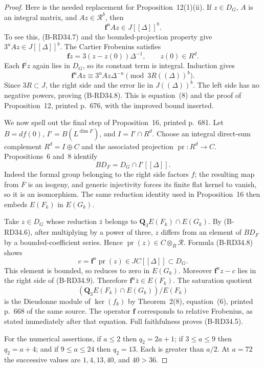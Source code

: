 \begin{proof}
Here is the needed replacement for Proposition~12(1)(ii). If
$z\in D_G$, $A$ is an integral matrix, and $Az\in\mathcal R^b$, then
\[
                     \mathbf f^uAz\in J[[\Delta]]^b.
                                                        \tag{B-RD34.8}
\]
To see this, (B-RD34.7) and the bounded-projection property give
$3^uAz\in J[[\Delta]]^b$. The Cartier Frobenius satisfies
\[
        \mathbf fz=3(z-z(0))\Delta^{-1},\qquad z(0)\in R^d.
\]
Each $\mathbf f^jz$ again lies in $D_G$, so its constant term is
integral. Induction gives
\[
   \mathbf f^uAz\equiv3^uAz\Delta^{-u}
                        \pmod{3R((\Delta))^b}.
\]
Since $3R\subset J$, the right side and the error lie in
$J((\Delta))^b$. The left side has no negative powers, proving
(B-RD34.8). This is equation~(8) and the proof of Proposition~12,
printed p.~676, with the improved bound inserted.

We now spell out the final step of Proposition~16, printed p.~681.
Let $B=df(0)$, $I'=B(L^{\dim F})$, and $I=I'\cap R^d$.
Choose an integral direct-sum complement $R^d=I\oplus C$ and
the associated projection $\operatorname{pr}:R^d\to C$.
Propositions~6 and~8 identify
\[
                     B D_F=D_G\cap I'[[\Delta]].
                                                        \tag{B-RD34.9}
\]
Indeed the formal group belonging to the right side factors $f$;
the resulting map from $F$ is an isogeny, and generic injectivity
forces its finite flat kernel to vanish, so it is an isomorphism.
The same reduction identity used in Proposition~16 then embeds
$E(F_k)$ in $E(G_k)$.

Take $z\in D_G$ whose reduction $\bar z$ belongs to
$\mathbf Q_3E(F_k)\cap E(G_k)$. By (B-RD34.6), after multiplying
by a power of three, $z$ differs from an element of $BD_F$ by a
bounded-coefficient series. Hence
$\operatorname{pr}(z)\in C\otimes_R\mathcal R$.
Formula (B-RD34.8) shows
\[
 c=\mathbf f^u\operatorname{pr}(z)\in J C[[\Delta]]
                                                \subset D_G.
\]
This element is bounded, so reduces to zero in $E(G_k)$. Moreover
$\mathbf f^uz-c$ lies in the right side of (B-RD34.9). Therefore
$\mathbf f^u\bar z\in E(F_k)$. The saturation quotient
\[
 (\mathbf Q_3E(F_k)\cap E(G_k))/E(F_k)
\]
is the Dieudonne module of $\ker(f_k)$ by Theorem~2(8), equation~(6),
printed p.~668 of the same source. The operator $\mathbf f$
corresponds to relative Frobenius, as stated immediately after that
equation. Full faithfulness proves (B-RD34.5).

For the numerical assertions, if $a\leq2$ then $q_2=2a+1$;
if $3\leq a\leq9$ then $q_2=a+4$; and if $9\leq a\leq24$
then $q_2=13$. Each is greater than $a/2$. At $a=72$ the successive
values are $1,4,13,40$, and $40>36$.
\end{proof}

